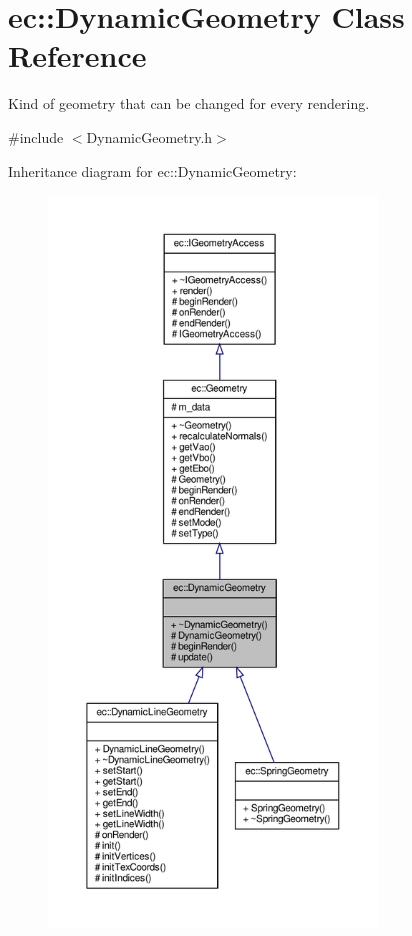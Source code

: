 \hypertarget{classec_1_1_dynamic_geometry}{}\section{ec\+:\+:Dynamic\+Geometry Class Reference}
\label{classec_1_1_dynamic_geometry}


Kind of geometry that can be changed for every rendering.  




{\ttfamily \#include $<$Dynamic\+Geometry.\+h$>$}



Inheritance diagram for ec\+:\+:Dynamic\+Geometry\+:\nopagebreak
\begin{figure}[H]
\begin{center}
\leavevmode
\includegraphics[height=550pt]{classec_1_1_dynamic_geometry__inherit__graph}
\end{center}
\end{figure}


